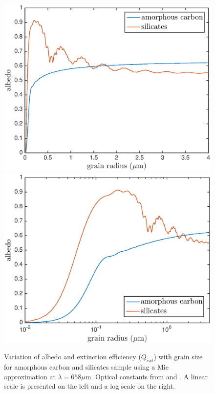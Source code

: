 \begin{figure}
\begin{center}
\includegraphics[trim =37 10 45 15,clip=true,scale=0.51]{albedo_grainsize_upto4}
\includegraphics[trim =37 10 45 15,clip=true,scale=0.51]{albedo_grainsize_upto4_log}
\caption{Variation of albedo and extinction efficiency ($Q_{ext}$) with grain size for amorphous carbon and silicates sample using a Mie approximation at $\lambda = 658 \mu $m. Optical constants from \citet{Zubko1996} and \citet{Draine1984}. A linear scale is presented on the left and a log scale on the right.}
\label{albedo_grain}
\end{center}
\end{figure}


